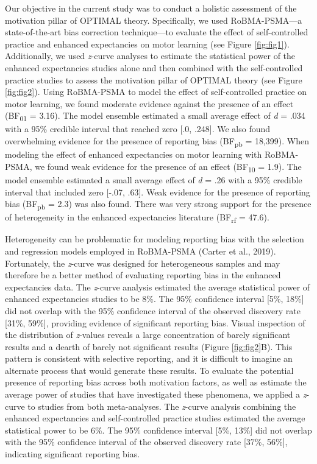 \documentclass[
  doc, donotrepeattitle,floatsintext]{apa7}
\begin{document}
Our objective in the current study was to conduct a holistic assessment of the motivation pillar of OPTIMAL theory. Specifically, we used RoBMA-PSMA---a state-of-the-art bias correction technique---to evaluate the effect of self-controlled practice and enhanced expectancies on motor learning (see Figure \ref{fig:fig1}). Additionally, we used \emph{z}-curve analyses to estimate the statistical power of the enhanced expectancies studies alone and then combined with the self-controlled practice studies to assess the motivation pillar of OPTIMAL theory (see Figure \ref{fig:fig2}). Using RoBMA-PSMA to model the effect of self-controlled practice on motor learning, we found moderate evidence against the presence of an effect (BF\textsubscript{01} = 3.16). The model ensemble estimated a small average effect of \emph{d} = .034 with a 95\% credible interval that reached zero {[}.0, .248{]}. We also found overwhelming evidence for the presence of reporting bias (BF\textsubscript{pb} = 18,399). When modeling the effect of enhanced expectancies on motor learning with RoBMA-PSMA, we found weak evidence for the presence of an effect (BF\textsubscript{10} = 1.9). The model ensemble estimated a small average effect of \emph{d} = .26 with a 95\% credible interval that included zero {[}-.07, .63{]}. Weak evidence for the presence of reporting bias (BF\textsubscript{pb} = 2.3) was also found. There was very strong support for the presence of heterogeneity in the enhanced expectancies literature (BF\textsubscript{rf} = 47.6).

Heterogeneity can be problematic for modeling reporting bias with the selection and regression models employed in RoBMA-PSMA (Carter et al., 2019). Fortunately, the \emph{z}-curve was designed for heterogeneous samples and may therefore be a better method of evaluating reporting bias in the enhanced expectancies data. The \emph{z}-curve analysis estimated the average statistical power of enhanced expectancies studies to be 8\%. The 95\% confidence interval {[}5\%, 18\%{]} did not overlap with the 95\% confidence interval of the observed discovery rate {[}31\%, 59\%{]}, providing evidence of significant reporting bias. Visual inspection of the distribution of \emph{z}-values reveals a large concentration of barely significant results and a dearth of barely not significant results (Figure \ref{fig:fig2}B). This pattern is consistent with selective reporting, and it is difficult to imagine an alternate process that would generate these results. To evaluate the potential presence of reporting bias across both motivation factors, as well as estimate the average power of studies that have investigated these phenomena, we applied a \emph{z}-curve to studies from both meta-analyses. The \emph{z}-curve analysis combining the enhanced expectancies and self-controlled practice studies estimated the average statistical power to be 6\%. The 95\% confidence interval {[}5\%, 13\%{]} did not overlap with the 95\% confidence interval of the observed discovery rate {[}37\%, 56\%{]}, indicating significant reporting bias.
\end{document}
